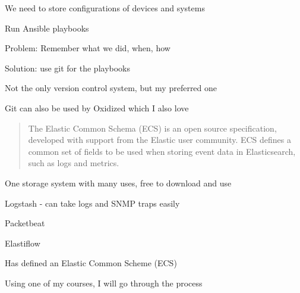 \documentclass[Screen16to9,17pt]{foils}
\begin{document}


\begin{list2}
\item We need to store configurations of devices and systems
\item Run Ansible playbooks
\item Problem: Remember what we did, when, how
\item Solution: use git for the playbooks
\item Not the only version control system, but my preferred one
\item Git can also be used by Oxidized which I also love 
\end{list2}





\begin{quote}
The Elastic Common Schema (ECS) is an open source specification, developed with support from the Elastic user community. ECS defines a common set of fields to be used when storing event data in Elasticsearch, such as logs and metrics.
\end{quote}

One storage system with many uses, free to download and use
\begin{list2}
\item Logstash - can take logs and SNMP traps easily
\item Packetbeat 
\item Elastiflow
\item Has defined an Elastic Common Scheme (ECS)\\
\end{list2}










\begin{quote}

\end{quote}

\begin{list2}
\item Using one of my courses, I will go through the process
\end{list2}
\end{document}
